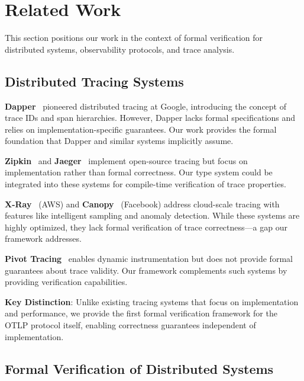 
\section{Related Work}
\label{sec:related}

This section positions our work in the context of formal verification for distributed systems, observability protocols, and trace analysis.

\subsection{Distributed Tracing Systems}
\label{sec:related-tracing}

\textbf{Dapper}~\cite{sigelman2010dapper} pioneered distributed tracing at Google, introducing the concept of trace IDs and span hierarchies. However, Dapper lacks formal specifications and relies on implementation-specific guarantees. Our work provides the formal foundation that Dapper and similar systems implicitly assume.

\textbf{Zipkin}~\cite{zipkin} and \textbf{Jaeger}~\cite{jaeger} implement open-source tracing but focus on implementation rather than formal correctness. Our type system could be integrated into these systems for compile-time verification of trace properties.

\textbf{X-Ray}~\cite{aws-xray} (AWS) and \textbf{Canopy}~\cite{kaldor2017canopy} (Facebook) address cloud-scale tracing with features like intelligent sampling and anomaly detection. While these systems are highly optimized, they lack formal verification of trace correctness—a gap our framework addresses.

\textbf{Pivot Tracing}~\cite{mace2015pivot} enables dynamic instrumentation but does not provide formal guarantees about trace validity. Our framework complements such systems by providing verification capabilities.

\textbf{Key Distinction}: Unlike existing tracing systems that focus on implementation and performance, we provide the first formal verification framework for the OTLP protocol itself, enabling correctness guarantees independent of implementation.

\subsection{Formal Verification of Distributed Systems}
\label{sec:related-verification}


